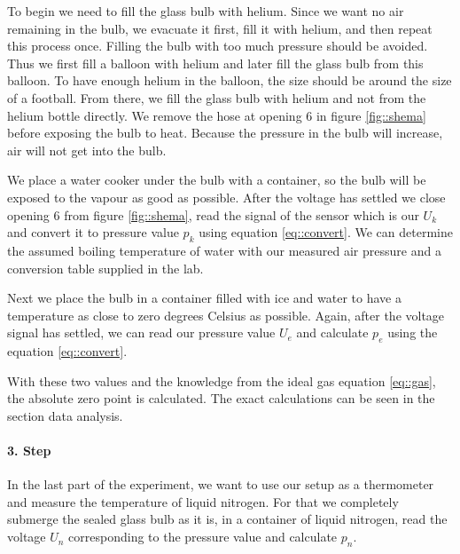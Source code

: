 To begin we need to fill the glass bulb with helium. 
Since we want no air remaining in the bulb, we evacuate it first, fill it with helium, and then repeat this process once. 
Filling the bulb with too much pressure should be avoided.
Thus we first fill a balloon with helium and later fill the glass bulb from this balloon. 
To have enough helium in the balloon, the size should be around the size of a football. 
From there, we fill the glass bulb with helium and not from the helium bottle directly. 
We remove the hose at opening 6 in figure \ref{fig::shema} before exposing the bulb to heat. 
Because the pressure in the bulb will increase, air will not get into the bulb. 


We place a water cooker under the bulb with a container, so the bulb will be exposed to the vapour as good as possible. 
After the voltage has settled we close opening 6 from figure \ref{fig::shema}, read the signal of the sensor which is our $U_k$ and convert it to pressure value $p_k$ using equation \ref{eq::convert}. 
We can determine the assumed boiling temperature of water with our measured air pressure and a conversion table supplied in the lab. 


Next we place the bulb in a container filled with ice and water to have a temperature as close to zero degrees Celsius as possible. 
Again, after the voltage signal has settled, we can read our pressure value $U_e$ and calculate $p_e$ using the equation \ref{eq::convert}.


With these two values and the knowledge from the ideal gas equation \ref{eq::gas}, the absolute zero point is calculated.
The exact calculations can be seen in the section data analysis.

\paragraph{3. Step}
In the last part of the experiment, we want to use our setup as a thermometer and measure the temperature of liquid nitrogen. 
For that we completely submerge the sealed glass bulb as it is, in a container of liquid nitrogen, read the voltage $U_n$ corresponding to the pressure value and calculate $p_n$.


